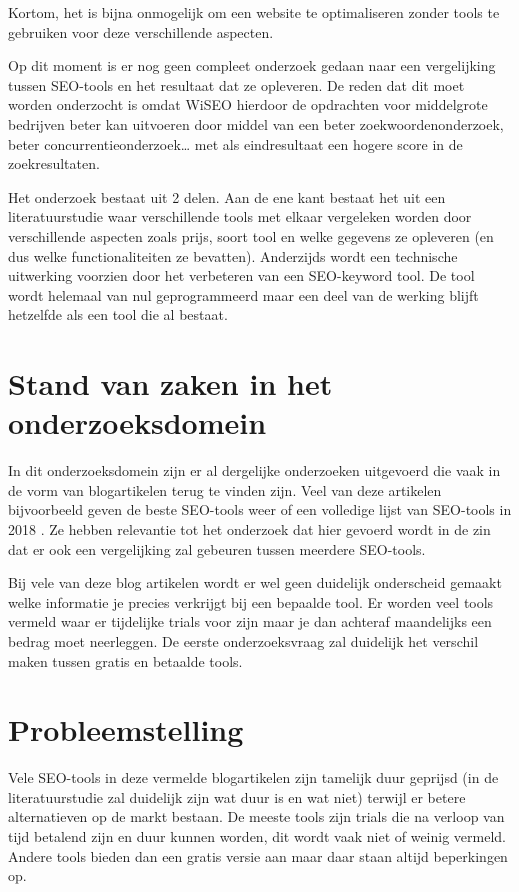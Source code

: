 Kortom, het is bijna onmogelijk om een website te optimaliseren zonder tools te gebruiken voor deze verschillende aspecten.

Op dit moment is er nog geen compleet onderzoek gedaan naar een vergelijking tussen SEO-tools en het resultaat dat ze opleveren. De reden dat dit moet worden onderzocht is omdat WiSEO hierdoor de opdrachten voor middelgrote bedrijven beter kan uitvoeren door middel van een beter zoekwoordenonderzoek, beter concurrentieonderzoek… met als eindresultaat een hogere score in de zoekresultaten.

Het onderzoek bestaat uit 2 delen. Aan de ene kant bestaat het uit een literatuurstudie waar verschillende tools met elkaar vergeleken worden door verschillende aspecten zoals prijs, soort tool en welke gegevens ze opleveren (en dus welke functionaliteiten ze bevatten). Anderzijds wordt een technische uitwerking voorzien door het verbeteren van een SEO-keyword tool. De tool wordt helemaal van nul geprogrammeerd maar een deel van de werking blijft hetzelfde als een tool die al bestaat. 


\section{Stand van zaken in het onderzoeksdomein}
\label{sec:Stand van zaken in het onderzoeksdomein}

In dit onderzoeksdomein zijn er al dergelijke onderzoeken uitgevoerd die vaak in de vorm van blogartikelen terug te vinden zijn. Veel van deze artikelen bijvoorbeeld geven de beste SEO-tools \textcite{SEO13} weer of een volledige lijst van SEO-tools in 2018 \textcite{SEOCOMPLETE}. Ze hebben relevantie tot het onderzoek dat hier gevoerd wordt in de zin dat er ook een vergelijking zal gebeuren tussen meerdere SEO-tools. 

Bij vele van deze blog artikelen wordt er wel geen duidelijk onderscheid gemaakt welke informatie je precies verkrijgt bij een bepaalde tool. Er worden veel tools vermeld waar er tijdelijke trials voor zijn maar je dan achteraf maandelijks een bedrag moet neerleggen. De eerste onderzoeksvraag zal duidelijk het verschil maken tussen gratis en betaalde tools. 


\section{Probleemstelling}
\label{sec:probleemstelling}

Vele SEO-tools in deze vermelde blogartikelen zijn tamelijk duur geprijsd (in de literatuurstudie zal duidelijk zijn wat duur is en wat niet) terwijl er betere alternatieven op de markt bestaan. De meeste tools zijn trials die na verloop van tijd betalend zijn en duur kunnen worden, dit wordt vaak niet of weinig vermeld. Andere tools bieden dan een gratis versie aan maar daar staan altijd beperkingen op. 

